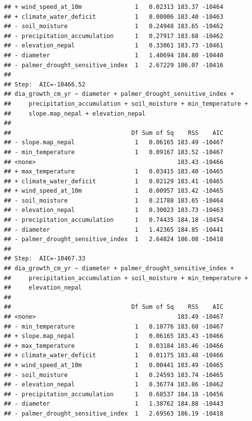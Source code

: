 \documentclass[
]{article}
\begin{document}
\begin{verbatim}
## + wind_speed_at_10m               1   0.02313 183.37 -10464
## + climate_water_deficit           1   0.00006 183.40 -10463
## - soil_moisture                   1   0.24948 183.65 -10462
## - precipitation_accumulation      1   0.27917 183.68 -10462
## - elevation_nepal                 1   0.33061 183.73 -10461
## - diameter                        1   1.40694 184.80 -10440
## - palmer_drought_sensitive_index  1   2.67229 186.07 -10416
## 
## Step:  AIC=-10466.52
## dia_growth_cm_yr ~ diameter + palmer_drought_sensitive_index + 
##     precipitation_accumulation + soil_moisture + min_temperature + 
##     slope.map_nepal + elevation_nepal
## 
##                                  Df Sum of Sq    RSS    AIC
## - slope.map_nepal                 1   0.06165 183.49 -10467
## - min_temperature                 1   0.09167 183.52 -10467
## <none>                                        183.43 -10466
## + max_temperature                 1   0.03415 183.40 -10465
## + climate_water_deficit           1   0.02129 183.41 -10465
## + wind_speed_at_10m               1   0.00957 183.42 -10465
## - soil_moisture                   1   0.21788 183.65 -10464
## - elevation_nepal                 1   0.30023 183.73 -10463
## - precipitation_accumulation      1   0.74435 184.18 -10454
## - diameter                        1   1.42365 184.85 -10441
## - palmer_drought_sensitive_index  1   2.64824 186.08 -10418
## 
## Step:  AIC=-10467.33
## dia_growth_cm_yr ~ diameter + palmer_drought_sensitive_index + 
##     precipitation_accumulation + soil_moisture + min_temperature + 
##     elevation_nepal
## 
##                                  Df Sum of Sq    RSS    AIC
## <none>                                        183.49 -10467
## - min_temperature                 1   0.10776 183.60 -10467
## + slope.map_nepal                 1   0.06165 183.43 -10466
## + max_temperature                 1   0.03184 183.46 -10466
## + climate_water_deficit           1   0.01175 183.48 -10466
## + wind_speed_at_10m               1   0.00441 183.49 -10465
## - soil_moisture                   1   0.24593 183.74 -10465
## - elevation_nepal                 1   0.36774 183.86 -10462
## - precipitation_accumulation      1   0.68537 184.18 -10456
## - diameter                        1   1.38762 184.88 -10443
## - palmer_drought_sensitive_index  1   2.69563 186.19 -10418
\end{verbatim}
\end{document}

